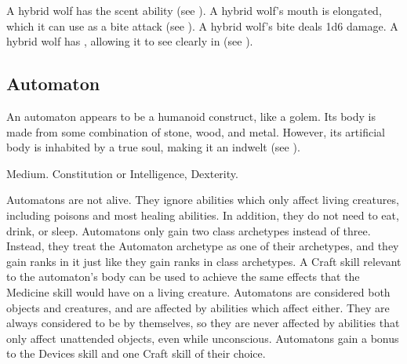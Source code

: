 
            \begin{itemize}
                 A hybrid wolf has the scent ability (see ).
                 A hybrid wolf's mouth is elongated, which it can use as a bite attack (see ).
                    A hybrid wolf's bite deals 1d6 damage.
                 A hybrid wolf has , allowing it to see clearly in  (see ).
            \end{itemize}

    \subsection{Automaton}
        An automaton appears to be a humanoid construct, like a golem.
        Its body is made from some combination of stone, wood, and metal.
        However, its artificial body is inhabited by a true soul, making it an indwelt (see ).

         Medium.
          Constitution or Intelligence,  Dexterity.
        \begin{itemize}
             Automatons are not alive. They ignore abilities which only affect living creatures, including poisons and most healing abilities. In addition, they do not need to eat, drink, or sleep.
             Automatons only gain two class archetypes instead of three.
                Instead, they treat the Automaton archetype as one of their archetypes, and they gain ranks in it just like they gain ranks in class archetypes.
             A Craft skill relevant to the automaton's body can be used to achieve the same effects that the Medicine skill would have on a living creature.
             Automatons are considered both objects and creatures, and are affected by abilities which affect either.
                They are always considered to be  by themselves, so they are never affected by abilities that only affect unattended objects, even while unconscious.
             Automatons gain a  bonus to the Devices skill and one Craft skill of their choice.
        \end{itemize}

